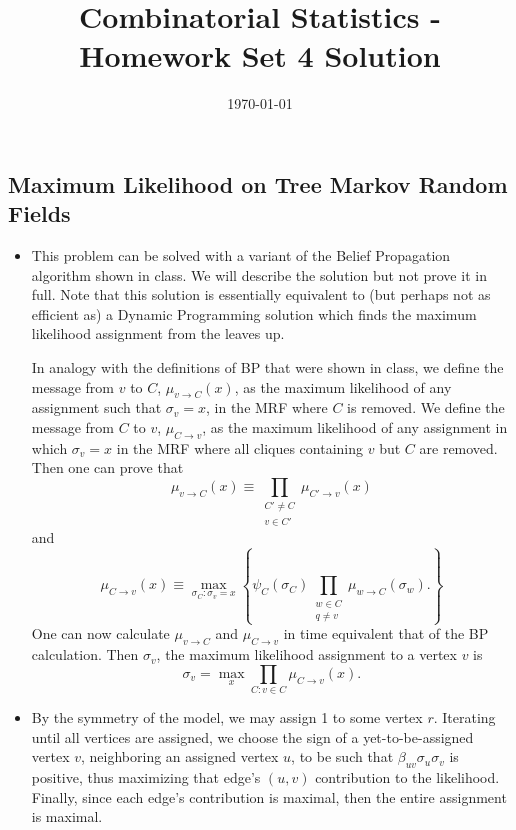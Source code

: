 \documentclass[11pt]{article} \usepackage{amssymb}
\begin{document}
\title{Combinatorial Statistics - Homework Set 4 Solution}

\date{\today}
\maketitle
\subsection{Maximum Likelihood on Tree Markov Random Fields}
\begin{itemize}
\item This problem can be solved with a variant of the Belief
  Propagation algorithm shown in class. We will describe the solution
  but not prove it in full. Note that this solution is essentially
  equivalent to (but perhaps not as efficient as) a Dynamic
  Programming solution which finds the maximum likelihood assignment
  from the leaves up.
   
  In analogy with the definitions of BP that were shown in class, we
  define the message from $v$ to $C$, $\mu_{v\to C}(x)$, as the
  maximum likelihood of any assignment such that $\sigma_v=x$, in the
  MRF where $C$ is removed. We define the message from $C$ to $v$,
  $\mu_{C\to v}$, as the maximum likelihood of any assignment in which
  $\sigma_v=x$ in the MRF where all cliques containing $v$ but $C$ are
  removed. Then one can prove that
  \begin{equation}
    \label{eq:bp1}
    \mu_{v\to C}(x) \equiv
    \prod_{\substack{C'\neq C\\ v\in C'}}\mu_{C'\to v}(x)
  \end{equation}
  and
  \begin{equation}
    \label{eq:bp2}
    \mu_{C\to v}(x) \equiv
    \max_{\sigma_C:\sigma_v=x}
    \left\{
      \psi_C(\sigma_C)
      \prod_{\substack{w\in C\\ q\neq v}}\mu_{w\to C}(\sigma_w).
    \right\}
  \end{equation}
  One can now calculate $\mu_{v\to C}$ and $\mu_{C\to v}$ in time
  equivalent that of the BP calculation.  Then $\sigma_v$, the maximum
  likelihood assignment to a vertex $v$ is
  \begin{equation}
    \label{eq:bp3}
    \sigma_v=\max_{x}\prod_{C:v\in C}\mu_{C\to v}(x).
  \end{equation}
  
\item By the symmetry of the model, we may assign 1 to some vertex
  $r$. Iterating until all vertices are assigned, we choose the sign
  of a yet-to-be-assigned vertex $v$, neighboring an assigned vertex
  $u$, to be such that $\beta_{uv}\sigma_u\sigma_v$ is positive, thus
  maximizing that edge's $(u,v)$ contribution to the
  likelihood. Finally, since each edge's contribution is maximal, then
  the entire assignment is maximal.


\end{itemize}
\end{document}
